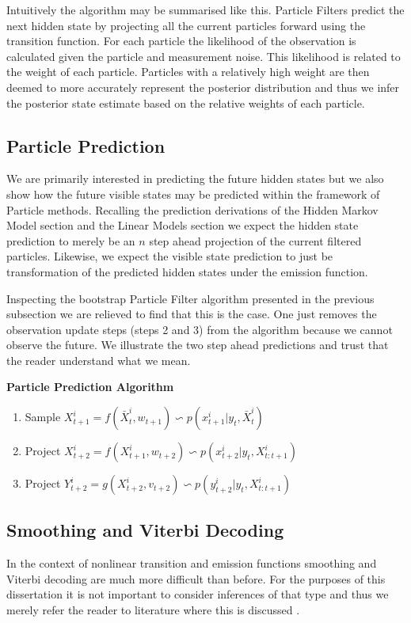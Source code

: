 \documentclass[../masters.tex]{subfiles}
\begin{document}
Intuitively the algorithm may be summarised like this. Particle Filters predict the next hidden state by projecting all the current particles forward using the transition function. For each particle the likelihood of the observation is calculated given the particle and measurement noise. This likelihood is related to the weight of each particle. Particles with a relatively high weight are then deemed to more accurately represent the posterior distribution and thus we infer the posterior state estimate based on the relative weights of each particle.

\subsection{Particle Prediction}
We are primarily interested in predicting the future hidden states but we also show how the future visible states may be predicted within the framework of Particle methods. Recalling the prediction derivations of the Hidden Markov Model section and the Linear Models section we expect the hidden state prediction to merely be an $n$ step ahead projection of the current filtered particles. Likewise, we expect the visible state prediction to just be transformation of the predicted hidden states under the emission function. 

Inspecting the bootstrap Particle Filter algorithm presented in the previous subsection we are relieved to find that this is the case. One just removes the observation update steps (steps 2 and 3) from the algorithm because we cannot observe the future. We illustrate the two step ahead predictions and trust that the reader understand what we mean.

\textbf{Particle Prediction Algorithm}
\begin{enumerate}
\item
Sample $X_{t+1}^i = f(\bar{X}_t^i, w_{t+1}) \backsim p(x_{t+1}^i|y_t, \bar{X}_t^i)$ 
\item
Project $X_{t+2}^i = f(X_{t+1}^i, w_{t+2}) \backsim p(x_{t+2}^i|y_t, X_{t:t+1}^i)$ 
\item
Project $Y_{t+2}^i = g(X_{t+2}^i, v_{t+2}) \backsim p(y_{t+2}^i|y_t, X_{t:t+1}^i)$ 
\end{enumerate}

\subsection{Smoothing and Viterbi Decoding}
In the context of nonlinear transition and emission functions smoothing and Viterbi decoding are much more difficult than before. For the purposes of this dissertation it is not important to consider inferences of that type and thus we merely refer the reader to literature where this is discussed \cite{pftut}\cite{gsf1}\cite{murphy1}\cite{murphy2}\cite{barber}.
\end{document}
